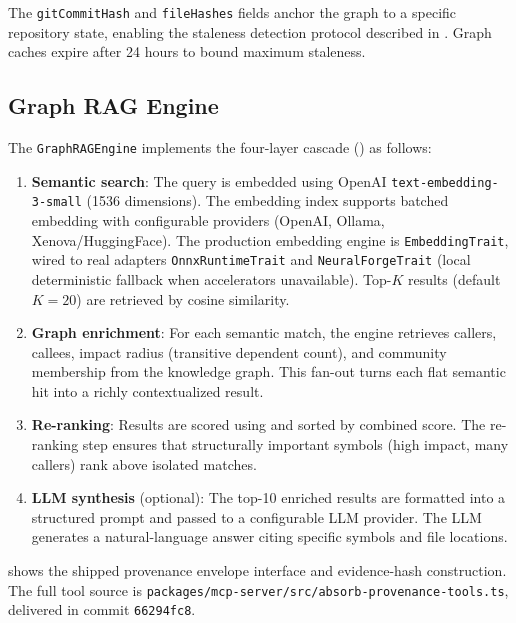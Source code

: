 \documentclass[conference]{IEEEtran}
\begin{document}
The \texttt{gitCommitHash} and \texttt{fileHashes} fields anchor the
graph to a specific repository state, enabling the staleness detection
protocol described in . Graph caches
expire after 24 hours to bound maximum staleness.

\subsection{Graph RAG Engine}
\label{sec:impl:graphrag}

The \texttt{GraphRAGEngine} implements the four-layer cascade
() as follows:

\begin{enumerate}
  \item \textbf{Semantic search}: The query is embedded using OpenAI
    \texttt{text-embedding-3-small} (1536 dimensions). The embedding
    index supports batched embedding with configurable providers
    (OpenAI, Ollama, Xenova/HuggingFace). The production embedding
    engine is \texttt{EmbeddingTrait}, wired to real adapters
    \texttt{OnnxRuntimeTrait} and \texttt{NeuralForgeTrait} (local
    deterministic fallback when accelerators unavailable). Top-$K$ results
    (default $K = 20$) are retrieved by cosine similarity.

  \item \textbf{Graph enrichment}: For each semantic match, the engine
    retrieves callers, callees, impact radius (transitive dependent
    count), and community membership from the knowledge graph. This
    fan-out turns each flat semantic hit into a richly contextualized
    result.

  \item \textbf{Re-ranking}: Results are scored using
     and sorted by combined score. The re-ranking
    step ensures that structurally important symbols (high impact,
    many callers) rank above isolated matches.

  \item \textbf{LLM synthesis} (optional): The top-10 enriched results
    are formatted into a structured prompt and passed to a configurable
    LLM provider. The LLM generates a natural-language answer citing
    specific symbols and file locations.
\end{enumerate}

 shows the shipped provenance envelope
interface and evidence-hash construction. The full tool source is
\texttt{packages/mcp-server/src/absorb-provenance-tools.ts}, delivered
in commit \texttt{66294fc8}.
\end{document}
